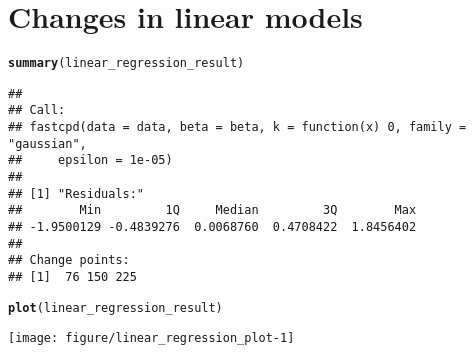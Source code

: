 \documentclass[article]{jss}\usepackage[]{graphicx}\usepackage[]{xcolor}
\makeatletter
\def\maxwidth{ %
  \ifdim\Gin@nat@width>\linewidth
    \linewidth
  \else
    \Gin@nat@width
  \fi
}
\newcommand{\hlstd}[1]{\textcolor[rgb]{0.345,0.345,0.345}{#1}}%
\newcommand{\hlkwd}[1]{\textcolor[rgb]{0.737,0.353,0.396}{\textbf{#1}}}%
\newenvironment{kframe}{%
 \def\at@end@of@kframe{}%
 \ifinner\ifhmode%
  \def\at@end@of@kframe{\end{minipage}}%
  \begin{minipage}{\columnwidth}%
 \fi\fi%
 \def\FrameCommand##1{\hskip\@totalleftmargin \hskip-\fboxsep
 \colorbox{shadecolor}{##1}\hskip-\fboxsep
     \hskip-\linewidth \hskip-\@totalleftmargin \hskip\columnwidth}%
 \MakeFramed {\advance\hsize-\width
   \@totalleftmargin\z@ \linewidth\hsize
   \@setminipage}}%
 {\par\unskip\endMakeFramed%
 \at@end@of@kframe}
\newenvironment{knitrout}{}{} %
\makeatother
\begin{document}
\section{Changes in linear models} \label{sec:linear model}



\begin{knitrout}
\color{fgcolor}\begin{kframe}
\begin{alltt}
\hlkwd{summary}\hlstd{(linear_regression_result)}
\end{alltt}
\begin{verbatim}
## 
## Call:
## fastcpd(data = data, beta = beta, k = function(x) 0, family = "gaussian", 
##     epsilon = 1e-05)
## 
## [1] "Residuals:"
##        Min         1Q     Median         3Q        Max 
## -1.9500129 -0.4839276  0.0068760  0.4708422  1.8456402 
## 
## Change points:
## [1]  76 150 225
\end{verbatim}
\begin{alltt}
\hlkwd{plot}\hlstd{(linear_regression_result)}
\end{alltt}
\end{kframe}
\texttt{[image: figure/linear\_regression\_plot-1]} 
\end{knitrout}
\end{document}
